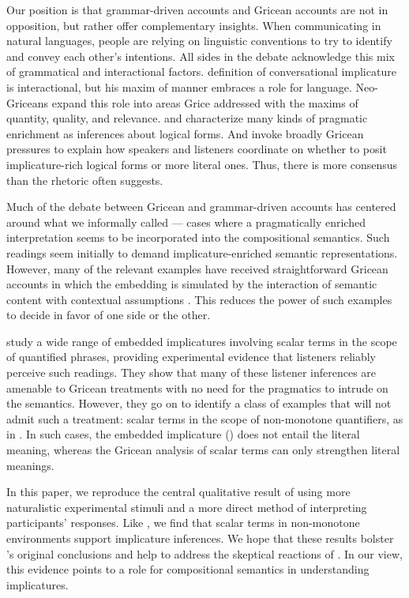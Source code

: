 \documentclass[leqno]{article}
\begin{document}
Our position is that grammar-driven accounts and Gricean accounts are
not in opposition, but rather offer complementary insights.  When
communicating in natural languages, people are relying on linguistic
conventions to try to identify and convey each other's intentions. All
sides in the debate acknowledge this mix of grammatical and
interactional factors.  definition of
conversational implicature is interactional, but his maxim of manner
embraces a role for language. Neo-Griceans expand this role into areas
Grice addressed with the maxims of quantity, quality, and
relevance. \citet{Sperber95} and \citet{Bach94} characterize many
kinds of pragmatic enrichment as inferences about logical forms. And
\citet{ChierchiaFoxSpector08} invoke broadly Gricean pressures to
explain how speakers and listeners coordinate on whether to posit
implicature-rich logical forms or more literal ones. Thus, there is
more consensus than the rhetoric often suggests.

Much of the debate between Gricean and grammar-driven accounts has
centered around what we informally called 
--- cases where a pragmatically enriched interpretation seems to be
incorporated into the compositional semantics. Such readings seem
initially to demand implicature-enriched semantic representations.
However, many of the relevant examples have received straightforward
Gricean accounts in which the embedding is simulated by the
interaction of semantic content with contextual assumptions
\citep{Russell06,Geurts09}. This reduces the power of such examples to
decide in favor of one side or the other.

\citet{Chemla:Spector:2011} study a wide range of embedded
implicatures involving scalar terms in the scope of quantified
phrases, providing experimental evidence that listeners reliably
perceive such readings. They show that many of these listener
inferences are amenable to Gricean treatments with no need for the
pragmatics to intrude on the semantics. However, they go on to
identify a class of examples that will not admit such a treatment:
scalar terms in the scope of non-monotone quantifiers, as in
. In such cases, the
embedded implicature ()
does not entail the literal meaning, whereas the Gricean analysis of
scalar terms can only strengthen literal meanings.

In this paper, we reproduce the central qualitative result of
\citet{Chemla:Spector:2011} using more naturalistic experimental
stimuli and a more direct method of interpreting participants'
responses. Like \citeauthor{Chemla:Spector:2011}, we find that scalar
terms in non-monotone environments support implicature inferences. We
hope that these results bolster \citeauthor{Chemla:Spector:2011}'s
original conclusions and help to address the skeptical reactions of
\citet{geurts-vantiel:2013:scalar}. In our view, this evidence points
to a role for compositional semantics in understanding implicatures.
\end{document}
